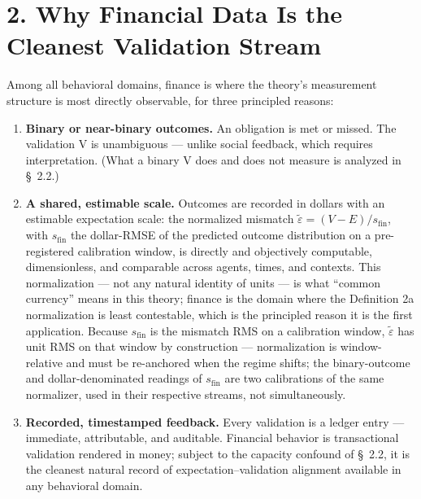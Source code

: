 \documentclass[
]{article}
\begin{document}
\section{2. Why Financial Data Is the Cleanest Validation
Stream}\label{why-financial-data-is-the-cleanest-validation-stream}

Among all behavioral domains, finance is where the theory's measurement
structure is most directly observable, for three principled reasons:

\begin{enumerate}
\def\labelenumi{\arabic{enumi}.}
\item
  \textbf{Binary or near-binary outcomes.} An obligation is met or
  missed. The validation V is unambiguous --- unlike social feedback,
  which requires interpretation. (What a binary V does and does not
  measure is analyzed in §~2.2.)
\item
  \textbf{A shared, estimable scale.} Outcomes are recorded in dollars
  with an estimable expectation scale: the normalized mismatch
  \(\tilde{\varepsilon} = (V - E)/s_{\mathrm{fin}}\), with
  \(s_{\mathrm{fin}}\) the dollar-RMSE of the predicted outcome
  distribution on a pre-registered calibration window, is directly and
  objectively computable, dimensionless, and comparable across agents,
  times, and contexts. This normalization --- not any natural identity
  of units --- is what ``common currency'' means in this theory; finance
  is the domain where the Definition 2a normalization is least
  contestable, which is the principled reason it is the first
  application. Because \(s_{\mathrm{fin}}\) is the mismatch RMS on a
  calibration window, \(\tilde{\varepsilon}\) has unit RMS on that
  window by construction --- normalization is window-relative and must
  be re-anchored when the regime shifts; the binary-outcome and
  dollar-denominated readings of \(s_{\mathrm{fin}}\) are two
  calibrations of the same normalizer, used in their respective streams,
  not simultaneously.
\item
  \textbf{Recorded, timestamped feedback.} Every validation is a ledger
  entry --- immediate, attributable, and auditable. Financial behavior
  is transactional validation rendered in money; subject to the capacity
  confound of §~2.2, it is the cleanest natural record of
  expectation--validation alignment available in any behavioral domain.
\end{enumerate}
\end{document}

